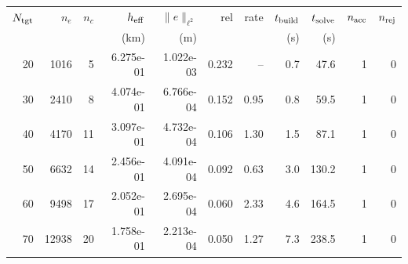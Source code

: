 \begin{tabular}{rrrrrrrrrrr}
\hline
$N_{\rm tgt}$ & $n_e$ & $n_c$ & $h_{\rm eff}$ & $\|e\|_{\ell^2}$ & rel & rate & $t_{\rm build}$ & $t_{\rm solve}$ & $n_{\rm acc}$ & $n_{\rm rej}$ \\
 & & & (km) & (m) & & & (s) & (s) & & \\
\hline
20 & 1016 & 5 & 6.275e-01 & 1.022e-03 & 0.232 & -- & 0.7 & 47.6 & 1 & 0 \\
30 & 2410 & 8 & 4.074e-01 & 6.766e-04 & 0.152 & 0.95 & 0.8 & 59.5 & 1 & 0 \\
40 & 4170 & 11 & 3.097e-01 & 4.732e-04 & 0.106 & 1.30 & 1.5 & 87.1 & 1 & 0 \\
50 & 6632 & 14 & 2.456e-01 & 4.091e-04 & 0.092 & 0.63 & 3.0 & 130.2 & 1 & 0 \\
60 & 9498 & 17 & 2.052e-01 & 2.695e-04 & 0.060 & 2.33 & 4.6 & 164.5 & 1 & 0 \\
70 & 12938 & 20 & 1.758e-01 & 2.213e-04 & 0.050 & 1.27 & 7.3 & 238.5 & 1 & 0 \\
\hline
\end{tabular}
